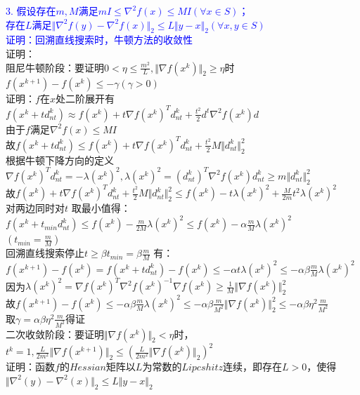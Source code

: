 \documentclass{article}
\begin{document}
\newpage
\textcolor{blue}{3. 假设存在$m,M$满足$mI \leq \nabla^2 f(x) \leq MI (\forall x \in S)$；\\
存在$L$满足$\Vert \nabla^2 f(y)  - \nabla^2 f(x)\Vert_2  \leq L \Vert y-x \Vert_2 (\forall x,y \in S)$\\
证明：回溯直线搜索时，牛顿方法的收敛性 }\\
证明：\\
阻尼牛顿阶段：要证明$0 < \eta \leq \frac{m^2}{L} , \Vert \nabla f(x^k) \Vert_2 \geq \eta $时 $f(x^{k+1}) - f(x^k) \leq -\gamma (\gamma > 0)$\\
证明：$f$在$x$处二阶展开有 $f(x^k+td^k_{nt}) \approx f(x^k) + t \nabla f(x^k)^T d^k_{nt} + \frac{t^2}{2}d^t\nabla^2 f(x^k)d$\\
由于$f$满足$\nabla^2 f(x) \leq MI$\\
故$f(x^k+td^k_{nt}) \leq f(x^k) + t \nabla f(x^k)^T d^k_{nt} + \frac{t^2}{2}M\Vert d^k_{nt} \Vert_2^2$\\
根据牛顿下降方向的定义 $ \nabla f(x^k)^T d^k_{nt} = -\lambda(x^k)^2, \lambda(x^k)^2 = (d^k_{nt})^T \nabla^2 f(x^k) d^k_{nt} \geq m \Vert d^k_{nt}\Vert_2^2$\\
故$f(x^k) + t \nabla f(x^k)^T d^k_{nt} + \frac{t^2}{2}M\Vert d^k_{nt} \Vert_2^2 \leq f(x^k) - t \lambda(x^k)^2 + \frac{M}{2m}t^2 \lambda(x^k)^2 $\\
对两边同时对$t$ 取最小值得：$ f(x^k + t_{min}d^k_{nt}) \leq f(x^k) - \frac{m}{2M}  \lambda(x^k)^2 \leq f(x^k) - \alpha \frac{m}{M}  \lambda(x^k)^2 $ \\$(t_{min} = \frac{m}{M})$\\
回溯直线搜索停止$t \geq \beta t_{min} = \beta \frac{m}{M}$ 有：\\
$f(x^{k+1}) - f(x^k) = f(x^k+td^k_{nt}) - f(x^k) \leq -\alpha t \lambda(x^k)^2 \leq -\alpha \beta \frac{m}{M} \lambda(x^k)^2 $\\
因为$ \lambda(x^k)^2 =  \nabla f(x^k)^T  \nabla^2 f(x^k)^{-1}  \nabla f(x^k) \geq \frac{1}{M} \Vert  \nabla f(x^k) \Vert_2^2$\\
故$f(x^{k+1}) - f(x^k) \leq -\alpha \beta \frac{m}{M} \lambda(x^k)^2 \leq -\alpha \beta \frac{m}{M^2} \Vert  \nabla f(x^k) \Vert_2^2 \leq -\alpha \beta \eta ^2\frac{m}{M^2}$\\
取$\gamma = \alpha \beta \eta ^2\frac{m}{M^2}$得证\\
二次收敛阶段：要证明$\Vert  \nabla f(x^k) \Vert_2 < \eta$时，$t^k = 1, \frac{L}{2m^2}\Vert  \nabla f(x^{k+1}) \Vert_2 \leq (\frac{L}{2m^2}\Vert  \nabla f(x^k) \Vert_2)^2$\\
证明：函数$f$的$Hessian$矩阵以$L$为常数的$Lipcshitz$连续，即存在$L>0$，使得$\Vert  \nabla^2(y) - \nabla^2(x)\Vert_2 \leq L\Vert y-x\Vert_2$\\
\end{document}
